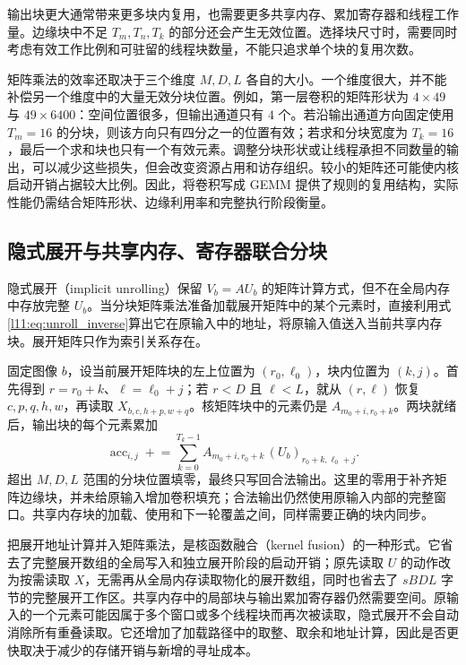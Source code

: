 输出块更大通常带来更多块内复用，也需要更多共享内存、累加寄存器和线程工作量。边缘块中不足 $T_m,T_n,T_k$ 的部分还会产生无效位置。选择块尺寸时，需要同时考虑有效工作比例和可驻留的线程块数量，不能只追求单个块的复用次数。

矩阵乘法的效率还取决于三个维度 $M,D,L$ 各自的大小。一个维度很大，并不能补偿另一个维度中的大量无效分块位置。例如，第一层卷积的矩阵形状为 $4\times49$ 与 $49\times6400$：空间位置很多，但输出通道只有 $4$ 个。若沿输出通道方向固定使用 $T_m=16$ 的分块，则该方向只有四分之一的位置有效；若求和分块宽度为 $T_k=16$，最后一个求和块也只有一个有效元素。调整分块形状或让线程承担不同数量的输出，可以减少这些损失，但会改变资源占用和访存组织。较小的矩阵还可能使内核启动开销占据较大比例。因此，将卷积写成 GEMM 提供了规则的复用结构，实际性能仍需结合矩阵形状、边缘利用率和完整执行阶段衡量。

\subsection{隐式展开与共享内存、寄存器联合分块}
\label{l11:subsec:implicit_unroll}

隐式展开（implicit unrolling）保留 $V_b=AU_b$ 的矩阵计算方式，但不在全局内存中存放完整 $U_b$。当分块矩阵乘法准备加载展开矩阵中的某个元素时，直接利用式\eqref{l11:eq:unroll_inverse}算出它在原输入中的地址，将原输入值送入当前共享内存块。展开矩阵只作为索引关系存在。

固定图像 $b$，设当前展开矩阵块的左上位置为 $(r_0,\ell_0)$，块内位置为 $(k,j)$。首先得到 $r=r_0+k$、$\ell=\ell_0+j$；若 $r<D$ 且 $\ell<L$，就从 $(r,\ell)$ 恢复 $c,p,q,h,w$，再读取 $X_{b,c,h+p,w+q}$。核矩阵块中的元素仍是 $A_{m_0+i,r_0+k}$。两块就绪后，输出块的每个元素累加
\begin{equation}
  \operatorname{acc}_{i,j}
  \mathrel{+}=\sum_{k=0}^{T_k-1}
  A_{m_0+i,r_0+k}\,(U_b)_{r_0+k,\ell_0+j}.
  \label{l11:eq:implicit_tile}
\end{equation}
超出 $M,D,L$ 范围的分块位置填零，最终只写回合法输出。这里的零用于补齐矩阵边缘块，并未给原输入增加卷积填充；合法输出仍然使用原输入内部的完整窗口。共享内存块的加载、使用和下一轮覆盖之间，同样需要正确的块内同步。

把展开地址计算并入矩阵乘法，是核函数融合（kernel fusion）的一种形式。它省去了完整展开数组的全局写入和独立展开阶段的启动开销；原先读取 $U$ 的动作改为按需读取 $X$，无需再从全局内存读取物化的展开数组，同时也省去了 $sBDL$ 字节的完整展开工作区。共享内存中的局部块与输出累加寄存器仍然需要空间。原输入的一个元素可能因属于多个窗口或多个线程块而再次被读取，隐式展开不会自动消除所有重叠读取。它还增加了加载路径中的取整、取余和地址计算，因此是否更快取决于减少的存储开销与新增的寻址成本。

